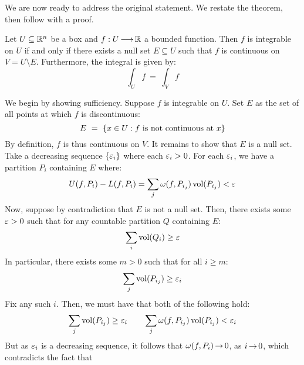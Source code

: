 We are now ready to address the original statement.
We restate the theorem, then follow with a proof.

\begin{thm}
    Let $ U \subseteq \mathbb{R}^{n} $ be a box and $ f: U \operatorname{\longrightarrow} \mathbb{R} $ a bounded
    function. \vsp
    Then $ f $ is integrable on $ U $ if and only if there exists a null set
    $ E \subseteq U $ such that $ f $ is continuous on $ V = U \setminus E $.
    Furthermore, the integral is given by:
    \begin{equation*}
        \int_{U}f \ = \ \int_{V}f
    \end{equation*}
\end{thm}

\begin{pf}
    We begin by showing sufficiency. Suppose $ f $ is integrable on $ U $.
    Set $ E $ as the set of all points at which $ f $ is discontinuous:
    \begin{equation*}
        E \ = \ \left\{{x \in U: f \textrm{ is not continuous at } x}\right\}
    \end{equation*}
    By definition, $ f $ is thus continuous on $ V $. It remains to show that
    $ E $ is a null set. Take a decreasing sequence $ \left\{{\operatorname{\varepsilon}_{i}}\right\} $ where each
    $ \operatorname{\varepsilon}_{i} > 0 $. For each $ \operatorname{\varepsilon}_{i} $, we have a partition $ P_{i} $
    containing $ E $ where:
    \begin{equation*}
        U(f,P_{i})-L(f,P_{i}) = \sum_{j}\omega(f,P_{i_{j}})\operatorname{vol}(P_{i_{j}}) < \operatorname{\varepsilon}
    \end{equation*}
    Now, suppose by contradiction that $ E $ is not a null set. Then, there
    exists some $ \operatorname{\varepsilon} > 0 $ such that for any countable partition $ Q $
    containing $ E $:
    \begin{equation*}
        \sum_{i}\operatorname{vol}(Q_{i}) \geq \operatorname{\varepsilon}
    \end{equation*}
    In particular, there exists some $ m > 0 $ such that for all $ i \geq m $:
    \begin{equation*}
        \sum_{j}\operatorname{vol}(P_{i_{j}}) \geq \operatorname{\varepsilon}_{i}
    \end{equation*}
    Fix any such $ i $. Then, we must have that both of the following hold:
    \begin{equation*}
        \sum_{j}\operatorname{vol}(P_{i_{j}}) \geq \operatorname{\varepsilon}_{i} \qquad
        \sum_{j}\omega(f,P_{i_{j}})\operatorname{vol}(P_{i_{j}}) < \operatorname{\varepsilon}_{i}
    \end{equation*}
    But as $ \operatorname{\varepsilon}_{i} $ is a decreasing sequence, it follows that
    $ \omega(f,P_{i}) \operatorname{\rightarrow} 0 $, as $ i \operatorname{\rightarrow} 0 $, which contradicts the fact that

\end{pf}
